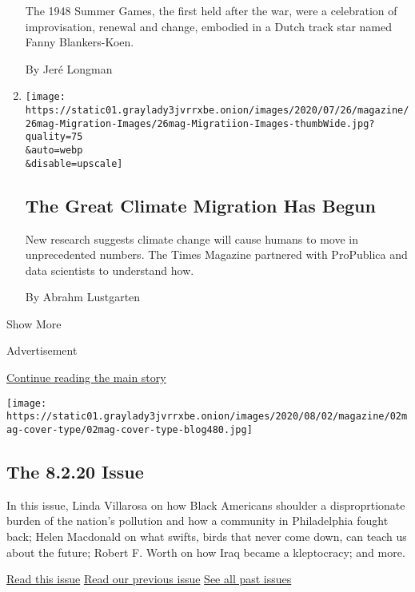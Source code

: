 \begin{enumerate}
  The 1948 Summer Games, the first held after the war, were a
  celebration of improvisation, renewal and change, embodied in a Dutch
  track star named Fanny Blankers-Koen.

  By Jeré Longman
\item
  \href{/interactive/2020/07/23/magazine/climate-migration.html}{}

  \texttt{[image: https://static01.graylady3jvrrxbe.onion/images/2020/07/26/magazine/26mag-Migration-Images/26mag-Migratiion-Images-thumbWide.jpg?quality=75\\\&auto=webp\\\&disable=upscale]}

  \hypertarget{the-great-climate-migration-has-begun}{%
  \subsection{The Great Climate Migration Has
  Begun}\label{the-great-climate-migration-has-begun}}

  New research suggests climate change will cause humans to move in
  unprecedented numbers. The Times Magazine partnered with ProPublica
  and data scientists to understand how.

  By Abrahm Lustgarten
\end{enumerate}

Show More

Advertisement

\protect\hyperlink{after-mid2}{Continue reading the main story}

\href{https://www.nytimes3xbfgragh.onion/issue/magazine/2020/07/31/the-8220-issue}{}

\texttt{[image: https://static01.graylady3jvrrxbe.onion/images/2020/08/02/magazine/02mag-cover-type/02mag-cover-type-blog480.jpg]}

\href{https://www.nytimes3xbfgragh.onion/issue/magazine/2020/07/31/the-8220-issue}{}

\hypertarget{the-8220-issue}{%
\subsection{The 8.2.20 Issue}\label{the-8220-issue}}

In this issue, Linda Villarosa on how Black Americans shoulder a
disproprtionate burden of the nation's pollution and how a community in
Philadelphia fought back; Helen Macdonald on what swifts, birds that
never come down, can teach us about the future; Robert F. Worth on how
Iraq became a kleptocracy; and more.

\href{https://www.nytimes3xbfgragh.onion/issue/magazine/2020/07/31/the-8220-issue}{Read
this issue}
\href{https://www.nytimes3xbfgragh.onion/issue/magazine/2020/07/24/the-72620-issue}{Read
our previous issue}
\href{https://www.nytimes3xbfgragh.onion/interactive/2020/07/02/magazine/past-issues-sunday-magazine.html}{See
all past issues}

